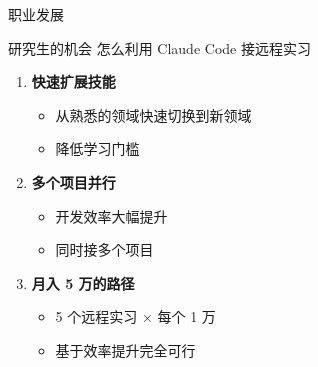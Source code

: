 \documentclass[aspectratio=169,xcolor=dvipsnames]{beamer}
\begin{document}
\begin{frame}{职业发展}
  \begin{block}{研究生的机会}
    怎么利用 Claude Code 接远程实习
  \end{block}

  \vspace{0.3cm}

  \begin{enumerate}
    \item \textbf{快速扩展技能}
    \begin{itemize}
      \item 从熟悉的领域快速切换到新领域
      \item 降低学习门槛
    \end{itemize}

    \vspace{0.2cm}

    \item \textbf{多个项目并行}
    \begin{itemize}
      \item 开发效率大幅提升
        \item 同时接多个项目
    \end{itemize}

    \vspace{0.2cm}

    \item \textbf{月入 5 万的路径}
    \begin{itemize}
      \item 5 个远程实习 × 每个 1 万
      \item 基于效率提升完全可行
    \end{itemize}
  \end{enumerate}
\end{frame}
\end{document}
